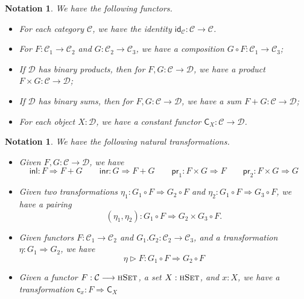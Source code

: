 \documentclass[9pt]{entcs}
\newtheorem{notation}[thm]{Notation}
\newcommand{\type}[1]{\textsc{#1}}
\newcommand{\functortxt}[1]{\mathsf{#1}}
\newcommand{\nattranstxt}[1]{\mathsf{#1}}
\newcommand{\hset}{\type{hSet}} %
\newcommand{\0}{\textbf{0}} %
\newcommand{\functor}[2]{#1 \longrightarrow #2} %
\newcommand{\idf}[1]{\functortxt{id}_{#1}} %
\newcommand{\Cf}[1]{\functortxt{C}_{#1}} %
\newcommand{\compf}[2]{#2 \circ #1} %
\newcommand{\prodf}[2]{#1 \times #2} %
\newcommand{\sumf}[2]{#1 + #2} %
\newcommand{\nattrans}[2]{#1 \Longrightarrow #2} %
\newcommand{\ctrans}[1]{\nattranstxt{c}_{#1}} %
\newcommand{\lwhisker}[2]{#2 \vartriangleright #1} %
\newcommand{\inlt}{\nattranstxt{inl}} %
\newcommand{\inrt}{\nattranstxt{inr}} %
\newcommand{\prlt}{\nattranstxt{pr}_1} %
\newcommand{\prrt}{\nattranstxt{pr}_2} %
\newcommand{\pairt}[2]{(#1 , #2)} %
\begin{document}
\begin{notation}
\label{def:functor}
We have the following functors.
\begin{itemize}
	\item For each category $\mathcal{C}$, we have the identity $\idf{\mathcal{C}} : \functor{\mathcal{C}}{\mathcal{C}}$.
	\item For $F : \functor{\mathcal{C}_1}{\mathcal{C}_2}$ and $G : \functor{\mathcal{C}_2}{\mathcal{C}_3}$, we have a composition $\compf{F}{G} : \functor{\mathcal{C}_1}{\mathcal{C}_3}$;
	\item If $\mathcal{D}$ has binary products, then for $F, G : \functor{\mathcal{C}}{\mathcal{D}}$, we have a product $\prodf{F}{G} : \functor{\mathcal{C}}{\mathcal{D}}$;
	\item If $\mathcal{D}$ has binary sums, then for $F, G : \functor{\mathcal{C}}{\mathcal{D}}$, we have a sum $\sumf{F}{G} : \functor{\mathcal{C}}{\mathcal{D}}$;
	\item For each object $X : \mathcal{D}$, we have a constant functor $\Cf{X} : \functor{\mathcal{C}}{\mathcal{D}}$.
\end{itemize}
\end{notation}

\begin{notation}
\label{def:nattrans}
We have the following natural transformations.
\begin{itemize}
	\item Given $F, G : \functor{\mathcal{C}}{\mathcal{D}}$, we have
	\[
	\inlt : \nattrans{F}{\sumf{F}{G}}
	\quad \quad
	\inrt : \nattrans{G}{\sumf{F}{G}}
	\quad \quad
	\prlt : \nattrans{\prodf{F}{G}}{F}
	\quad \quad
	\prrt : \nattrans{\prodf{F}{G}}{G}
	\]
	\item Given two transformations $\eta_1 : \nattrans{\compf{F}{G_1}}{\compf{F}{G_2}}$ and $\eta_2 : \nattrans{\compf{F}{G_1}}{\compf{F}{G_3}}$, we have a pairing 
	\[
	\pairt{\eta_1}{\eta_2} : \nattrans{\compf{F}{G_1}}{\compf{F}{\prodf{G_2}{G_3}}}.
	\]
	\item Given functors $F : \functor{\mathcal{C}_1}{\mathcal{C}_2}$ and $G_1. G_2 : \functor{\mathcal{C}_2}{\mathcal{C}_3}$, and a transformation $\eta : \nattrans{G_1}{G_2}$, we have
	\[
	\lwhisker{F}{\eta} : \nattrans{\compf{F}{G_1}}{\compf{F}{G_2}}
	\]
	\item Given a functor $F : \functor{\mathcal{C}}{\hset}$, a set $X : \hset$, and $x : X$, we have a transformation $\ctrans{x} : \nattrans{F}{\Cf{X}}$
\end{itemize}
\end{notation}
\end{document}
